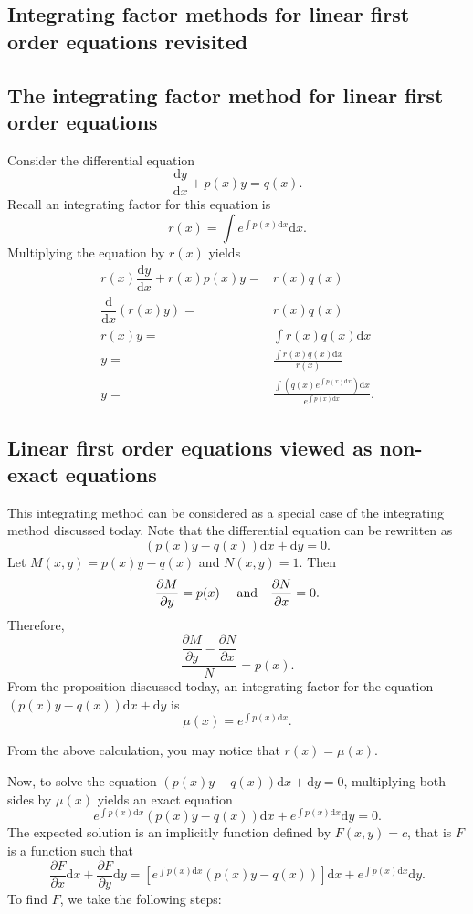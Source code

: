 \begin{subappendices}
\section{Integrating factor methods for linear first order equations revisited}
\subsection{The integrating factor method for linear first order equations}

Consider the differential equation
$$\dfrac{\mathrm{d}y}{\mathrm{d}x}+p(x)y=q(x).$$
Recall an integrating factor for this equation is
$$r(x)=\int e^{\int p(x)\mathrm{d}x}\mathrm{d}x.$$
Multiplying the equation by $r(x)$ yields
$$
\begin{aligned}
  r(x)\dfrac{\mathrm{d}y}{\mathrm{d}x}+r(x)p(x)y=&r(x)q(x)\\
  \dfrac{\mathrm{d}}{\mathrm{d}x}\left(r(x)y\right)=&r(x)q(x)\\
  r(x)y=&\int r(x)q(x)\mathrm{d} x\\
  y=&\frac{\int r(x)q(x)\mathrm{d} x}{r(x)}\\
  y=&\frac{\int(q(x)e^{\int p(x)\mathrm{d}x})\mathrm{d} x}{e^{\int p(x)\mathrm{d}x}}.
\end{aligned}
$$

\subsection{Linear first order equations viewed as non-exact equations}

This integrating method can be considered as a special case of the integrating method discussed today.
Note that the differential equation can be rewritten as
$$(p(x)y-q(x))\mathrm{d} x + \mathrm{d} y=0.$$
Let $M(x, y)=p(x)y-q(x)$ and $N(x, y)=1$. Then
$$\dfrac{\partial M}{\partial y}=p(x)\quad \textup{ and}\quad \dfrac{\partial N}{\partial x}=0.$$
Therefore,
$$\dfrac{\dfrac{\partial M}{\partial y}-\dfrac{\partial N}{\partial x}}{N}=p(x).$$
From the proposition discussed today, an integrating factor for the equation $(p(x)y-q(x))\mathrm{d} x + \mathrm{d} y$ is
$$\mu(x)=e^{\int p(x)\mathrm{d} x}.$$

From the above calculation, you may notice that $r(x)=\mu(x)$.

Now, to solve the equation $(p(x)y-q(x))\mathrm{d} x + \mathrm{d} y=0$, multiplying both sides by $\mu(x)$ yields an exact equation
$$e^{\int p(x)\mathrm{d}x}(p(x)y-q(x))\mathrm{d} x + e^{\int p(x)\mathrm{d}x} \mathrm{d} y=0.$$
The expected solution is an implicitly function defined by $F(x, y)=c$, that is $F$ is a function such that
$$\frac{\partial  F}{\partial x}\mathrm{d} x + \frac{\partial  F}{\partial y}\mathrm{d} y = \left[e^{\int p(x)\mathrm{d}x}(p(x)y-q(x))\right]\mathrm{d} x + e^{\int p(x)\mathrm{d}x} \mathrm{d} y.$$
To find $F$, we take the following steps:


\end{subappendices}
